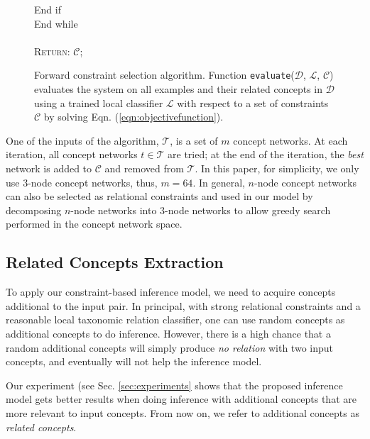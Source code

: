 {\begin{figure}[!t]
\begin{centering}
{{\begin{minipage}{6in}
\begin{tabbing}
            \qquad \qquad End if \\
            \qquad End while \\
            \\
            \qquad \textsc{Return}: $\mathcal{C}$; \\
          \end{tabbing}
        \end{minipage}
      }
    }
  \end{centering}
  \caption{
    \label{alg:forwardselection}
    Forward constraint selection algorithm. Function
    \texttt{evaluate}($\mathcal{D}$, $\mathcal{L}$, $\mathcal{C}$)
    evaluates the system on all examples and their related concepts in
    $\mathcal{D}$ using a trained local classifier $\mathcal{L}$ with
    respect to a set of constraints $\mathcal{C}$ by solving
    Eqn. (\ref{eqn:objectivefunction}).}
\end{figure}

One of the inputs of the algorithm, $\mathcal{T}$, is a set of $m$
concept networks. At each iteration, all concept networks $t \in
\mathcal{T}$ are tried; at the end of the iteration, the {\em
  best} network is added to $\mathcal{C}$ and removed from
$\mathcal{T}$. In this paper, for simplicity, we only use 3-node
concept networks, thus, $m = 64$. In general, $n$-node concept
networks can also be selected as relational constraints and used in
our model by decomposing $n$-node networks into $3$-node
networks to allow greedy search performed in the concept network
space.
}

\subsection{Related Concepts Extraction}
\label{sec:rel-con-ext}

To apply our constraint-based inference model, we need to acquire
concepts additional to the input pair. In principal, with strong
relational constraints and a reasonable local taxonomic relation classifier, one
can use random concepts as additional concepts to do
inference. However, there is a high chance that a random additional
concepts will simply produce {\em no relation} with two input
concepts, and eventually will not help the inference model.
Our experiment (see Sec. \ref{sec:experiments} shows that the proposed
inference model gets better results when doing inference with
additional concepts that are more relevant to input concepts. From now
on, we refer to additional concepts as {\em related concepts}.


